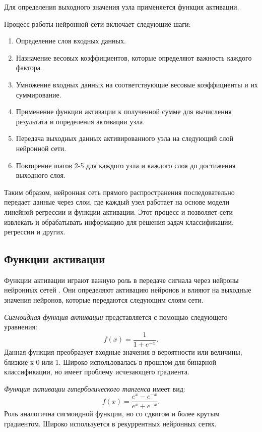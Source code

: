 Для определения выходного значения узла применяется функция активации.

Процесс работы нейронной сети включает следующие шаги:
\begin{enumerate}
    \item Определение слоя входных данных.
    \item Назначение весовых коэффициентов, которые определяют важность каждого фактора.
    \item Умножение входных данных на соответствующие весовые коэффициенты и их суммирование.
    \item Применение функции активации к полученной сумме для вычисления результата и определения активации узла.
    \item Передача выходных данных активированного узла на следующий слой нейронной сети.
    \item Повторение шагов 2-5 для каждого узла и каждого слоя до достижения выходного слоя.
\end{enumerate}

Таким образом, нейронная сеть прямого распространения последовательно передает данные через слои, где каждый узел работает на основе модели линейной регрессии и функции активации. Этот процесс и позволяет сети извлекать и обрабатывать информацию для решения задач классификации, регрессии и других.

\subsection{Функции активации}

Функции активации играют важную роль в передаче сигнала через нейроны нейронных сетей \cite{activations}. Они определяют активацию нейронов и влияют на выходные значения нейронов, которые передаются следующим слоям сети.

\textit{Сигмоидная функция активации} представляется с помощью следующего уравнения:
\begin{equation}
   f(x) = \frac{1}{{1 + e^{-x}}}.
\end{equation}
Данная функция преобразует входные значения в вероятности или величины, близкие к 0 или 1. Широко использовалась в прошлом для бинарной классификации, но имеет проблему исчезающего градиента.

\textit{Функция активации гиперболического тангенса} имеет вид:
\begin{equation}
   f(x) = \frac{{e^x - e^{-x}}}{{e^x + e^{-x}}}.
\end{equation}
Роль аналогична сигмоидной функции, но со сдвигом и более крутым градиентом. Широко используется в рекуррентных нейронных сетях.

